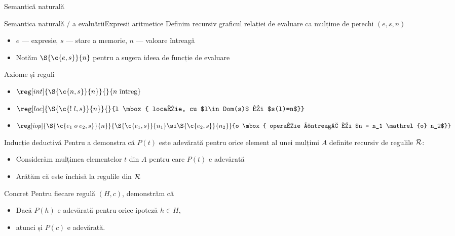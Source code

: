 \begin{section}{Semantică naturală}
\begin{frame}{Semantica naturală / a evaluării}{Expresii aritmetice}
Definim recursiv graficul relației de evaluare ca mulțime de perechi $(e, s, n)$
\begin{itemize}
  \item $e$ --- expresie, $s$ --- stare a memorie, $n$ --- valoare întreagă
  \item Notăm $\S{\c{e,s}}{n}$ pentru a sugera ideea de funcție de evaluare
\end{itemize}

\vfill\begin{block}{Axiome și reguli}
\begin{itemize}
\item[] $\reg[int]{\S{\c{n,s}}{n}}{}{n \mbox{ întreg}}$

\item[]$\reg[loc]{\S{\c{{\mathrel{!} l},s}}{n}}{}{l \mbox{ locație, cu $l\in Dom(s)$ și $s(l)=n$}}$

\item[]$\reg[iop]{\S{\c{e_1\mathrel{o} e_2,s}}{n}}{\S{\c{e_1,s}}{n_1}\si \S{\c{e_2,s}}{n_2}}{o \mbox{ operație întreagă și $n = n_1 \mathrel{o} n_2$}}$
\end{itemize}
\end{block}
\end{frame}

\begin{frame}{Inducție deductivă}
Pentru a demonstra că $P(t)$ este adevărată pentru orice element al unei mulțimi $A$ definite recursiv de regulile $\cal R$:
\begin{itemize}
  \item Considerăm mulțimea elementelor $t$ din $A$ pentru care $P(t)$ e adevărată
 \item Arătăm că este închisă la regulile din $\cal R$
\end{itemize}

\begin{block}{Concret}
Pentru fiecare regulă $(H,c)$, demonstrăm că
\begin{itemize} 
\item Dacă $P(h)$ e adevărată pentru orice ipoteză $h\in H$,
\item atunci și $P(c)$ e adevărată.
\end{itemize}	
\end{block}
\end{frame}


\end{section}
